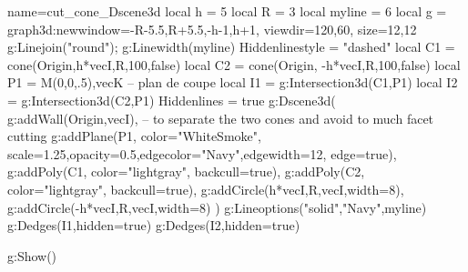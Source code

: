\documentclass[12pt]{standalone}
\begin{document}
\begin{luadraw}{name=cut_cone_Dscene3d}
local h = 5
local R = 3
local myline = 6
local g = graph3d:new{window={-R-5.5,R+5.5,-h-1,h+1}, viewdir={120,60}, size={12,12}}
g:Linejoin("round"); g:Linewidth(myline)
Hiddenlinestyle = "dashed"
local C1 = cone(Origin,h*vecI,R,100,false) 
local C2 = cone(Origin, -h*vecI,R,100,false)
local P1 = {M(0,0,.5),vecK} -- plan de coupe
local I1 = g:Intersection3d(C1,P1)
local I2 = g:Intersection3d(C2,P1) 
Hiddenlines = true
g:Dscene3d(
    g:addWall({Origin,vecI}), -- to separate the two cones and avoid to much facet cutting
    g:addPlane(P1, {color="WhiteSmoke", scale=1.25,opacity=0.5,edgecolor="Navy",edgewidth=12, edge=true}),    
    g:addPoly(C1, {color="lightgray", backcull=true}),
    g:addPoly(C2, {color="lightgray", backcull=true}),
    g:addCircle(h*vecI,R,vecI,{width=8}), g:addCircle(-h*vecI,R,vecI,{width=8})
    )
g:Lineoptions("solid","Navy",myline)
g:Dedges(I1,{hidden=true})
g:Dedges(I2,{hidden=true})

g:Show()
\end{luadraw}
\end{document}

